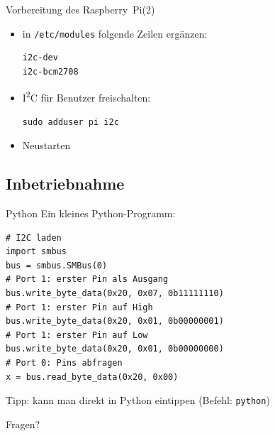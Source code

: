 \documentclass{beamer}
\newcommand{\ItC}{I\textsuperscript{2}C\xspace}
\newcommand{\RPi}{Raspberry~Pi\xspace}
\begin{document}
\begin{frame}[fragile]{Vorbereitung des \RPi  (2)}
 \begin{itemize}
  \item in \lstinline|/etc/modules| folgende Zeilen ergänzen:
    \begin{lstlisting}
i2c-dev
i2c-bcm2708
    \end{lstlisting}
  \item \ItC für Benutzer freischalten:
    \begin{lstlisting}
sudo adduser pi i2c
    \end{lstlisting}
  \item Neustarten
 \end{itemize}
\end{frame}

\subsection{Inbetriebnahme}

\begin{frame}[fragile]{Python}
 Ein kleines Python-Programm:
 \lstset{language=Python}
 \begin{lstlisting}
# I2C laden
import smbus
bus = smbus.SMBus(0)
# Port 1: erster Pin als Ausgang
bus.write_byte_data(0x20, 0x07, 0b11111110)
# Port 1: erster Pin auf High
bus.write_byte_data(0x20, 0x01, 0b00000001)
# Port 1: erster Pin auf Low
bus.write_byte_data(0x20, 0x01, 0b00000000)
# Port 0: Pins abfragen
x = bus.read_byte_data(0x20, 0x00)
 \end{lstlisting}
 Tipp: kann man direkt in Python eintippen (Befehl: \lstinline[language=bash]|python|)
\end{frame}

\begin{frame}[plain]
        \begin{center}
        \huge Fragen?
    \end{center}
        \tableofcontents
\end{frame}
\end{document}
